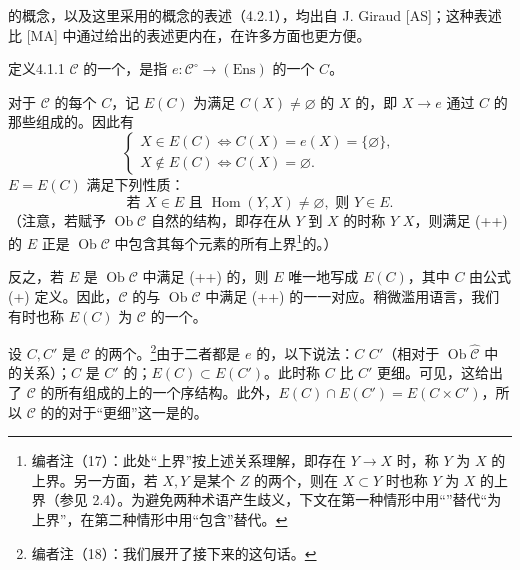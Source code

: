 的概念，以及这里采用的概念的表述（4.2.1），均出自 J. Giraud [AS]；这种表述比 [MA] 中通过给出的表述更内在，在许多方面也更方便。

\begin{SGAresult}{定义}{4.1.1}
 $\mathcal C$ 的一个，是指 $e:\mathcal C^{\circ}\to(\mathrm{Ens})$ 的一个 $C$。
\end{SGAresult}
对于 $\mathcal C$ 的每个 $C$，记 $E(C)$ 为满足 $C(X)\ne\varnothing$ 的 $X$ 的，即 $X\to e$ 通过 $C$ 的那些组成的。因此有
\[
\begin{cases}
X\in E(C)\iff C(X)=e(X)=\{\varnothing\},\\
X\notin E(C)\iff C(X)=\varnothing.
\end{cases}\tag{+}
\]
 $E=E(C)$ 满足下列性质：
\[
\text{若 }X\in E\text{ 且 }\operatorname{Hom}(Y,X)\ne\varnothing,\text{ 则 }Y\in E.\tag{++}
\]
（注意，若赋予 $\operatorname{Ob}\mathcal C$ 自然的结构，即存在从 $Y$ 到 $X$ 的时称 $Y$  $X$，则满足 (++) 的 $E$
正是 $\operatorname{Ob}\mathcal C$ 中包含其每个元素的所有上界\footnote{编者注（17）：此处“上界”按上述关系理解，即存在 $Y\to X$ 时，称 $Y$ 为 $X$ 的上界。另一方面，若 $X,Y$ 是某个 $Z$ 的两个，则在 $X\subset Y$ 时也称 $Y$ 为 $X$ 的上界（参见 2.4）。为避免两种术语产生歧义，下文在第一种情形中用“”替代“为上界”，在第二种情形中用“包含”替代。}的。）

反之，若 $E$ 是 $\operatorname{Ob}\mathcal C$ 中满足 (++) 的，则 $E$ 唯一地写成 $E(C)$，其中 $C$ 由公式 (+) 定义。因此，$\mathcal C$ 的与 $\operatorname{Ob}\mathcal C$ 中满足 (++) 的一一对应。稍微滥用语言，我们有时也称 $E(C)$ 为 $\mathcal C$ 的一个。

设 $C,C'$ 是 $\mathcal C$ 的两个。\footnote{编者注（18）：我们展开了接下来的这句话。}由于二者都是 $e$ 的，以下说法：$C$  $C'$（相对于 $\operatorname{Ob}\widehat{\mathcal C}$ 中的关系）；$C$ 是 $C'$ 的；$E(C)\subset E(C')$。此时称 $C$ 比 $C'$ 更细。可见，这给出了 $\mathcal C$ 的所有组成的上的一个序结构。此外，$E(C)\cap E(C')=E(C\times C')$，所以 $\mathcal C$ 的的对于“更细”这一是的。

